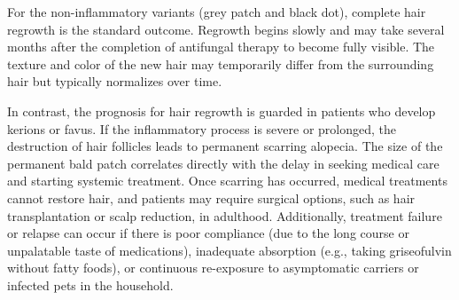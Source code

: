 For the non-inflammatory variants (grey patch and black dot), complete hair regrowth is the standard outcome. Regrowth begins slowly and may take several months after the completion of antifungal therapy to become fully visible. The texture and color of the new hair may temporarily differ from the surrounding hair but typically normalizes over time.

In contrast, the prognosis for hair regrowth is guarded in patients who develop kerions or favus. If the inflammatory process is severe or prolonged, the destruction of hair follicles leads to permanent scarring alopecia. The size of the permanent bald patch correlates directly with the delay in seeking medical care and starting systemic treatment. Once scarring has occurred, medical treatments cannot restore hair, and patients may require surgical options, such as hair transplantation or scalp reduction, in adulthood. Additionally, treatment failure or relapse can occur if there is poor compliance (due to the long course or unpalatable taste of medications), inadequate absorption (e.g., taking griseofulvin without fatty foods), or continuous re-exposure to asymptomatic carriers or infected pets in the household.

